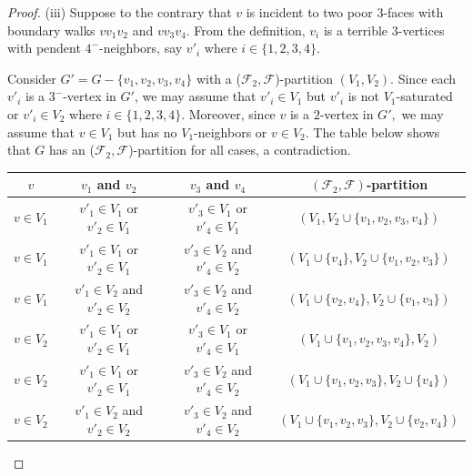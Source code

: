 \documentclass[11pt]{amsart} %
\theoremstyle{definition}
\begin{document}
\begin{proof}
	(iii)  Suppose to the contrary that 
	$v$ is incident to two poor $3$-faces
	with boundary walks $vv_1v_2$ and $vv_3v_4.$  
	From the definition,  $v_i$ is a terrible $3$-vertices 
	with pendent $4^-$-neighbors, say $v'_i$ 
	where $i\in \{1,2,3,4\}$.   
	
	Consider $G'=G-\{v_1,v_2,v_3,v_4\}$ with 
	a ($\mathcal{F}_2,\mathcal{F}$)-partition $(V_1,V_2).$  
	Since each $v'_i$ is a $3^-$-vertex	in $G'$, 
	we may assume that $v'_i\in V_1$ but 
	$v'_i$ is not $V_1$-saturated or $v'_i\in V_2$  
	where $i\in \{1,2,3,4\}.$ 
	Moreover, since $v$ is a $2$-vertex in $G',$ 
	we may assume that $v\in V_1$ 
	but has no $V_1$-neighbors or $v\in V_2.$ 
	The table below shows that $G$ has 
	an ($\mathcal{F}_2,\mathcal{F}$)-partition for all cases, 
	a contradiction. 

\begin{center}
	\begin{tabular}{ |c|c|c|c| } 
		\hline
		$v$ & $v_1$ and $v_2$ &  $v_3$ and $v_4$  
		& $(\mathcal{F}_{2},  \mathcal{F})$-partition \\ 
	\hline
	$v\in V_1$ & $v'_1 \in V_1$ or $v'_2 \in V_1$ 
	&$v'_3 \in V_1$ or $v'_4 \in V_1$
	&$(V_1,V_2\cup\{v_1,v_2,v_3,v_4\})$\\ 
	\hline
	$v\in V_1$ & $v'_1 \in V_1$ or $v'_2 \in V_1$ 
	&$v'_3 \in V_2$ and $v'_4 \in V_2$
	&$(V_1\cup\{v_4\},V_2\cup\{v_1,v_2,v_3\})$\\ 
	\hline
	$v\in V_1$ & $v'_1 \in V_2$ and $v'_2 \in V_2$ 
	&$v'_3 \in V_2$ and $v'_4 \in V_2$
	&$(V_1\cup\{v_2,v_4\},V_2\cup\{v_1,v_3\})$\\
	\hline
	
	
	$v\in V_2$ & $v'_1 \in V_1$ or $v'_2 \in V_1$ 
	&$v'_3 \in V_1$ or $v'_4 \in V_1$
	&$(V_1\cup\{v_1,v_2,v_3,v_4\},V_2)$\\ 
	\hline
	$v\in V_2$ & $v'_1 \in V_1$ or $v'_2 \in V_1$ 
	&$v'_3 \in V_2$ and $v'_4 \in V_2$
	&$(V_1\cup\{v_1,v_2,v_3\},V_2\cup\{v_4\})$\\ 
	\hline
	$v\in V_2$ & $v'_1 \in V_2$ and $v'_2 \in V_2$ 
	&$v'_3 \in V_2$ and $v'_4 \in V_2$
	&$(V_1\cup\{v_1,v_2,v_3\},V_2\cup\{v_2,v_4\})$\\ 
	\hline
	\end{tabular}
\end{center}

\end{proof}
\end{document}
